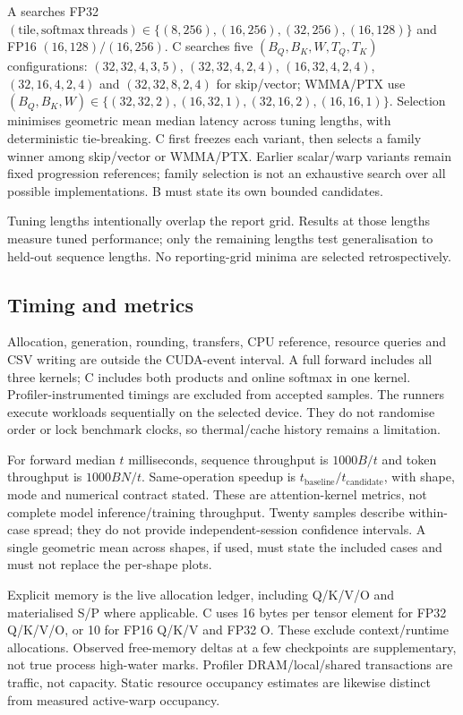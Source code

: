 \documentclass[11pt,a4paper]{article}
\begin{document}
A searches FP32 $(\mathrm{tile},\mathrm{softmax\ threads})\in
\{(8,256),(16,256),(32,256),(16,128)\}$ and FP16 $(16,128)/(16,256)$.
C searches five $(B_Q,B_K,W,T_Q,T_K)$ configurations:
$(32,32,4,3,5)$, $(32,32,4,2,4)$, $(16,32,4,2,4)$,
$(32,16,4,2,4)$ and $(32,32,8,2,4)$ for skip/vector;
WMMA/PTX use $(B_Q,B_K,W)\in\{(32,32,2),(16,32,1),(32,16,2),(16,16,1)\}$.
Selection minimises geometric mean median latency across tuning lengths, with
deterministic tie-breaking. C first freezes each variant, then selects a family
winner among skip/vector or WMMA/PTX. Earlier scalar/warp variants remain fixed
progression references; family selection is not an exhaustive search over all
possible implementations. B must state its own bounded candidates.

Tuning lengths intentionally overlap the report grid. Results at those lengths
measure tuned performance; only the remaining lengths test generalisation to
held-out sequence lengths. No reporting-grid minima are selected retrospectively.

\subsection{Timing and metrics}
Allocation, generation, rounding, transfers, CPU reference, resource queries and
CSV writing are outside the CUDA-event interval. A full forward includes all
three kernels; C includes both products and online softmax in one kernel.
Profiler-instrumented timings are excluded from accepted samples. The runners
execute workloads sequentially on the selected device. They do not randomise
order or lock benchmark clocks, so thermal/cache history remains a limitation.

For forward median $t$ milliseconds, sequence throughput is $1000B/t$ and token
throughput is $1000BN/t$. Same-operation speedup is $t_{\mathrm{baseline}}/
 t_{\mathrm{candidate}}$, with shape, mode and numerical contract stated. These
are attention-kernel metrics, not complete model inference/training throughput.
Twenty samples describe within-case spread; they do not provide independent-session
confidence intervals. A single geometric mean across shapes, if used, must
state the included cases and must not replace the per-shape plots.

Explicit memory is the live allocation ledger, including Q/K/V/O and materialised
S/P where applicable. C uses 16 bytes per tensor element for FP32 Q/K/V/O,
or 10 for FP16 Q/K/V and FP32 O. These exclude context/runtime allocations.
Observed free-memory deltas at a few checkpoints are supplementary, not true
process high-water marks. Profiler DRAM/local/shared transactions are traffic,
not capacity. Static resource occupancy estimates are likewise distinct from
measured active-warp occupancy.
\end{document}
